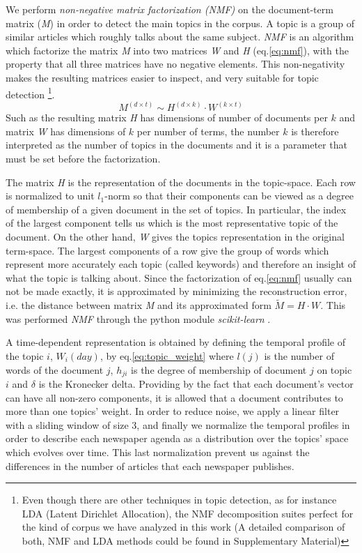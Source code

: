 \documentclass[10pt,letterpaper]{article}
\begin{document}
\par We perform \emph{non-negative matrix factorization (NMF)} \cite{xu2003document, lee1999learning} on the document-term matrix (\emph{M}) in order to detect the main topics in the corpus. A topic is a group of similar articles which roughly talks about the same subject. 
\emph{NMF} is an algorithm which factorize the matrix \emph{M} into two matrices \emph{W} and \emph{H} (eq.\ref{eq:nmf}), with the property that all three matrices have no negative elements. This non-negativity makes the resulting matrices easier to inspect, and very suitable for topic detection \footnote{ Even though there are other techniques in topic detection, as for instance LDA (Latent Dirichlet Allocation), the NMF decomposition suites perfect for the kind of corpus we  have analyzed in this work (A detailed comparison of both, NMF and LDA methods could be found in Supplementary Material)}. 
\begin{equation}
M^{(d \times t)} \sim H^{(d \times k)} \cdot W^{(k \times t)}
\label{eq:nmf}
\end{equation}
Such as the resulting matrix \emph{H} has dimensions of number of documents per $k$ and matrix \emph{W} has dimensions of $k$ per number of terms, the number $k$ is therefore interpreted as the number of topics in the documents and it is a parameter that must be set before the factorization.
\par The matrix \emph{H} is the representation of the documents in the topic-space. Each row is normalized to unit $l_1$-norm so that their components can be viewed as a degree of membership of a given document in the set of topics. In particular, the index of the largest component tells us which is the most representative topic of the document.
On the other hand, \emph{W} gives the topics representation in the original term-space. The largest components of a row give the group of words which represent more accurately each topic (called keywords) and therefore an insight of what the topic is talking about.
Since the factorization of eq.\ref{eq:nmf} usually can not be made exactly, it is approximated by minimizing the reconstruction error, i.e. the distance between matrix \emph{M} and its approximated form $\tilde{M} = H \cdot W$. This was performed \emph{NMF} through the python module \emph{scikit-learn} \cite{scikit-learn}.

\par A time-dependent representation is obtained by defining the temporal profile of the topic $i$, $W_i(day)$, by eq.\ref{eq:topic_weight} where $l(j)$ is the number of words of the document $j$, $h_{ji}$ is the degree of membership of document $j$ on topic $i$ and $\delta$ is the Kronecker delta. Providing by the fact that each document's vector can have all non-zero components, it is allowed that a document contributes to more than one topics' weight.
In order to reduce noise, we apply a linear filter with a sliding window of size 3, and finally we normalize the temporal profiles in order to describe each newspaper agenda as a distribution over the topics' space which evolves over time. This last normalization prevent us against the differences in the number of articles that each newspaper publishes.
\end{document}
